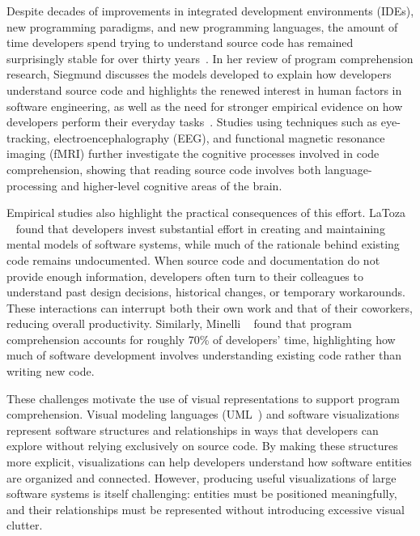 \documentclass[../main.tex]{subfiles}
\begin{document}
Despite decades of improvements in integrated development environments (IDEs), new programming paradigms, and new programming languages, the amount of time developers spend trying to understand source code has remained surprisingly stable for over thirty years~. In her review of program comprehension research, Siegmund discusses the models developed to explain how developers understand source code and highlights the renewed interest in human factors in software engineering, as well as the need for stronger empirical evidence on how developers perform their everyday tasks~. Studies using techniques such as eye-tracking, electroencephalography (EEG), and functional magnetic resonance imaging (fMRI) further investigate the cognitive processes involved in code comprehension, showing that reading source code involves both language-processing and higher-level cognitive areas of the brain.

Empirical studies also highlight the practical consequences of this effort. LaToza \etal~ found that developers invest substantial effort in creating and maintaining mental models of software systems, while much of the rationale behind existing code remains undocumented. When source code and documentation do not provide enough information, developers often turn to their colleagues to understand past design decisions, historical changes, or temporary workarounds. These interactions can interrupt both their own work and that of their coworkers, reducing overall productivity. Similarly, Minelli \etal~ found that program comprehension accounts for roughly 70\% of developers' time, highlighting how much of software development involves understanding existing code rather than writing new code.

These challenges motivate the use of visual representations to support program comprehension. Visual modeling languages (\eg UML~) and software visualizations~ represent software structures and relationships in ways that developers can explore without relying exclusively on source code. By making these structures more explicit, visualizations can help developers understand how software entities are organized and connected. However, producing useful visualizations of large software systems is itself challenging: entities must be positioned meaningfully, and their relationships must be represented without introducing excessive visual clutter.
\end{document}
